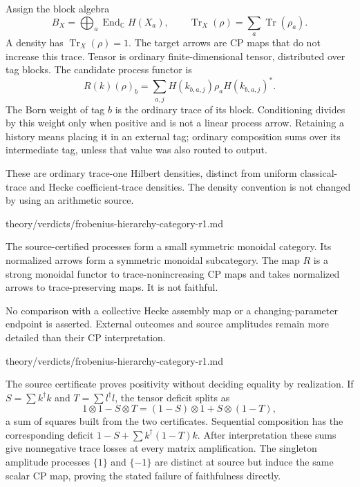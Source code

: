 \begin{definition}
Assign the block algebra
\[
 B_X=\bigoplus_a\operatorname{End}_{\mathbb C}H(X_a),\qquad
 \operatorname{Tr}_X(\rho)=\sum_a\operatorname{Tr}(\rho_a).
\]
A density has $\operatorname{Tr}_X(\rho)=1$. The target arrows are CP maps
that do not increase this trace. Tensor is ordinary finite-dimensional
tensor, distributed over tag blocks. The candidate process functor is
\[
 R(k)(\rho)_b=\sum_{a,j}H(k_{b,a,j})\rho_aH(k_{b,a,j})^*.
\]
The Born weight of tag $b$ is the ordinary trace of its block. Conditioning
divides by this weight only when positive and is not a linear process arrow.
Retaining a history means placing it in an external tag; ordinary composition
sums over its intermediate tag, unless that value was also routed to output.
\end{definition}
\begin{scope}
These are ordinary trace-one Hilbert densities, distinct from uniform
classical-trace and Hecke coefficient-trace densities. The density convention
is not changed by using an arithmetic source.
\end{scope}
{theory/verdicts/frobenius-hierarchy-category-r1.md}

\begin{theorem}\statusProved
The source-certified processes form a small symmetric monoidal category.
Its normalized arrows form a symmetric monoidal subcategory. The map $R$
is a strong monoidal functor to trace-nonincreasing CP maps and takes
normalized arrows to trace-preserving maps. It is not faithful.
\end{theorem}
\begin{scope}
No comparison with a collective Hecke assembly map or a changing-parameter
endpoint is asserted. External outcomes and source amplitudes remain more
detailed than their CP interpretation.
\end{scope}
{theory/verdicts/frobenius-hierarchy-category-r1.md}

The source certificate proves positivity without deciding equality by
realization. If $S=\sum k^\dagger k$ and $T=\sum l^\dagger l$, the tensor
deficit splits as
\[
 1\otimes1-S\otimes T=(1-S)\otimes1+S\otimes(1-T),
\]
a sum of squares built from the two certificates. Sequential composition
has the corresponding deficit $1-S+\sum k^\dagger(1-T)k$.
After interpretation these sums give nonnegative trace losses at every
matrix amplification. The singleton amplitude processes $\{1\}$ and
$\{-1\}$ are distinct at source but induce the same scalar CP map, proving
the stated failure of faithfulness directly.

